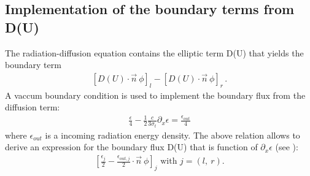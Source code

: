 \subsection{Implementation of the boundary terms from D(U)}
%
The radiation-diffusion equation contains the elliptic term D(U) that yields the boundary term 
%
\begin{eqnarray}
\left[D(U)\cdot \vec{n} \ \phi \right]_{l} - \left[D(U)\cdot \vec{n} \ \phi \right]_{r} \, .
\end{eqnarray}
%
A vaccum boundary condition is used to implement the boundary flux from the diffusion term:
%
\begin{eqnarray}
\frac{\epsilon}{4} - \frac{1}{2}\frac{c}{3 \sigma_t} \partial_x \epsilon = \frac{\epsilon_{out}}{4}
\end{eqnarray}
%
where $\epsilon_{out}$ is a incoming radiation energy density. The above relation allows to derive an expression for the boundary flux D(U) that is function of $\partial_x \epsilon$ (see ):
%
\begin{eqnarray}
\left[ \frac{\epsilon_j}{2} - \frac{\epsilon_{out,j}}{2} \cdot \vec{n} \ \phi \right]_{j} \text{ with } j = \left( l, \ r \right).
\end{eqnarray}
% 
